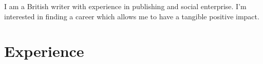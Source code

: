 \documentclass[DIV=15,color=blue!60!green!90]{komacv}
\begin{document}
  \rmfamily

  \maketitle

  \justify
  I am a British writer with experience in publishing and social enterprise. I’m
  interested in finding a career which allows me to have a tangible positive impact.

  \raggedright

  \vspace{-1em}

  \section{Experience}
\end{document}
